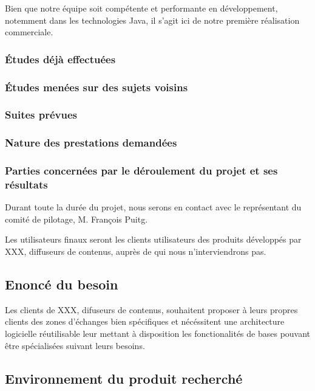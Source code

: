 Bien que notre équipe soit compétente et performante en développement, notemment dans les technologies Java, il s'agit ici de notre première réalisation commerciale.

\subsubsection{Études déjà effectuées}
\subsubsection{Études menées sur des sujets voisins}
\subsubsection{Suites prévues}
\subsubsection{Nature des prestations demandées}


\subsubsection{Parties concernées par le déroulement du projet et ses résultats}

Durant toute la durée du projet, nous serons en contact avec le représentant du comité de
pilotage, M. François Puitg.

Les utilisateurs finaux seront les clients utilisateurs des produits développés par XXX,
diffuseurs de contenus, auprès de qui nous n'interviendrons pas.

\subsection{Enoncé du besoin}
Les clients de XXX, difuseurs de contenus, souhaitent proposer à leurs propres clients des
zones d'échanges bien spécifiques et nécéssitent une architecture logicielle réutilisable leur mettant à disposition les fonctionalités de bases pouvant être spécialisées suivant leurs besoins.

\subsection{Environnement du produit recherché}

